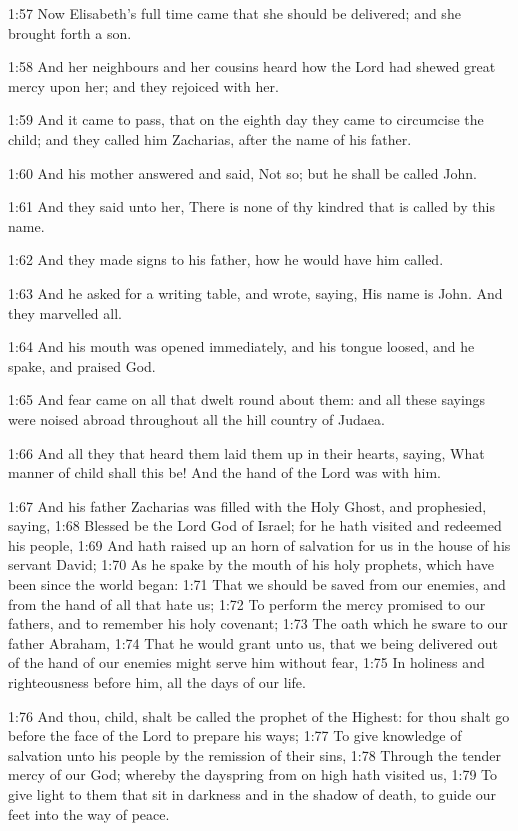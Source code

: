 1:57 Now Elisabeth's full time came that she should be delivered; and
she brought forth a son.

1:58 And her neighbours and her cousins heard how the Lord had shewed
great mercy upon her; and they rejoiced with her.

1:59 And it came to pass, that on the eighth day they came to
circumcise the child; and they called him Zacharias, after the name of
his father.

1:60 And his mother answered and said, Not so; but he shall be called
John.

1:61 And they said unto her, There is none of thy kindred that is
called by this name.

1:62 And they made signs to his father, how he would have him called.

1:63 And he asked for a writing table, and wrote, saying, His name is
John. And they marvelled all.

1:64 And his mouth was opened immediately, and his tongue loosed, and
he spake, and praised God.

1:65 And fear came on all that dwelt round about them: and all these
sayings were noised abroad throughout all the hill country of Judaea.

1:66 And all they that heard them laid them up in their hearts,
saying, What manner of child shall this be! And the hand of the Lord
was with him.

1:67 And his father Zacharias was filled with the Holy Ghost, and
prophesied, saying, 1:68 Blessed be the Lord God of Israel; for he
hath visited and redeemed his people, 1:69 And hath raised up an horn
of salvation for us in the house of his servant David; 1:70 As he
spake by the mouth of his holy prophets, which have been since the
world began: 1:71 That we should be saved from our enemies, and from
the hand of all that hate us; 1:72 To perform the mercy promised to
our fathers, and to remember his holy covenant; 1:73 The oath which he
sware to our father Abraham, 1:74 That he would grant unto us, that we
being delivered out of the hand of our enemies might serve him without
fear, 1:75 In holiness and righteousness before him, all the days of
our life.

1:76 And thou, child, shalt be called the prophet of the Highest: for
thou shalt go before the face of the Lord to prepare his ways; 1:77 To
give knowledge of salvation unto his people by the remission of their
sins, 1:78 Through the tender mercy of our God; whereby the dayspring
from on high hath visited us, 1:79 To give light to them that sit in
darkness and in the shadow of death, to guide our feet into the way of
peace.

